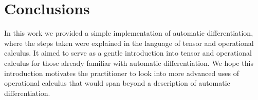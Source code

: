 \section{Conclusions}

In this work we provided a simple implementation of automatic differentiation, where the steps taken were explained in the language of tensor and operational calculus. It aimed to serve as a gentle introduction into tensor and operational calculus for those already familiar with automatic differentiation.
We hope this introduction motivates the practitioner to look into more advanced uses of operational calculus that would span beyond a description of automatic differentiation.
